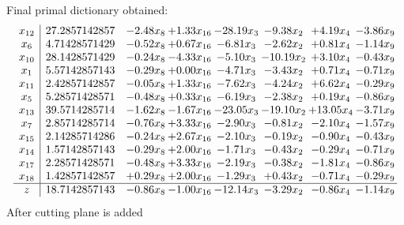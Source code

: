 \documentclass[8pt]{article}
\begin{document}
 Final primal dictionary obtained: 
\[\begin{array}{c| c c@{\hskip 2pt} c@{\hskip 2pt} c@{\hskip 2pt} c@{\hskip 2pt} c@{\hskip 2pt} c@{\hskip 2pt} }
 x_{12}   &  27.2857142857 & -2.48 x_{8} & +  1.33 x_{16} & -28.19 x_{3} & -9.38 x_{2} & +  4.19 x_{4} & -3.86 x_{9}\\
 x_{6}   &  4.71428571429 & -0.52 x_{8} & +  0.67 x_{16} & -6.81 x_{3} & -2.62 x_{2} & +  0.81 x_{4} & -1.14 x_{9}\\
 x_{10}   &  28.1428571429 & -0.24 x_{8} & -4.33 x_{16} & -5.10 x_{3} & -10.19 x_{2} & +  3.10 x_{4} & -0.43 x_{9}\\
 x_{1}   &  5.57142857143 & -0.29 x_{8} & +  0.00 x_{16} & -4.71 x_{3} & -3.43 x_{2} & +  0.71 x_{4} & -0.71 x_{9}\\
 x_{11}   &  2.42857142857 & -0.05 x_{8} & +  1.33 x_{16} & -7.62 x_{3} & -4.24 x_{2} & +  6.62 x_{4} & -0.29 x_{9}\\
 x_{5}   &  5.28571428571 & -0.48 x_{8} & +  0.33 x_{16} & -6.19 x_{3} & -2.38 x_{2} & +  0.19 x_{4} & -0.86 x_{9}\\
 x_{13}   &  39.5714285714 & -1.62 x_{8} & -1.67 x_{16} & -23.05 x_{3} & -19.10 x_{2} & + 13.05 x_{4} & -3.71 x_{9}\\
 x_{7}   &  2.85714285714 & -0.76 x_{8} & +  3.33 x_{16} & -2.90 x_{3} & -0.81 x_{2} & -2.10 x_{4} & -1.57 x_{9}\\
 x_{15}   &  2.14285714286 & -0.24 x_{8} & +  2.67 x_{16} & -2.10 x_{3} & -0.19 x_{2} & -0.90 x_{4} & -0.43 x_{9}\\
 x_{14}   &  1.57142857143 & -0.29 x_{8} & +  2.00 x_{16} & -1.71 x_{3} & -0.43 x_{2} & -0.29 x_{4} & -0.71 x_{9}\\
 x_{17}   &  2.28571428571 & -0.48 x_{8} & +  3.33 x_{16} & -2.19 x_{3} & -0.38 x_{2} & -1.81 x_{4} & -0.86 x_{9}\\
 x_{18}   &  1.42857142857 & +  0.29 x_{8} & +  2.00 x_{16} & -1.29 x_{3} & +  0.43 x_{2} & -0.71 x_{4} & -0.29 x_{9}\\
\hline
z    &  18.7142857143 & -0.86 x_{8} & -1.00 x_{16} & -12.14 x_{3} & -3.29 x_{2} & -0.86 x_{4} & -1.14 x_{9}\\
\end{array}\]
 After cutting plane is added 
\end{document}

